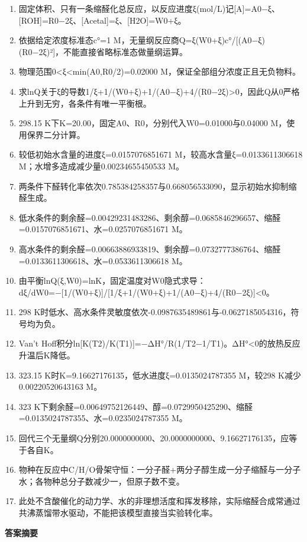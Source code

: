 \documentclass[UTF8,11pt,a4paper]{ctexart}
\begin{document}
\begin{enumerate}
\item 固定体积、只有一条缩醛化总反应，以反应进度ξ(mol/L)记[A]=A0−ξ、[ROH]=R0−2ξ、[Acetal]=ξ、[H2O]=W0+ξ。
\item 依据给定浓度标准态c°=1 M，无量纲反应商Q=ξ(W0+ξ)c°/[(A0−ξ)(R0−2ξ)²]，不能直接省略标准态做量纲运算。
\item 物理范围0<ξ<min(A0,R0/2)=0.02000 M，保证全部组分浓度正且无负物料。
\item 求lnQ关于ξ的导数1/ξ+1/(W0+ξ)+1/(A0−ξ)+4/(R0−2ξ)>0，因此Q从0严格上升到无穷，各条件有唯一平衡根。
\item 298.15 K下K=20.00，固定A0、R0，分别代入W0=0.01000与0.04000 M，使用保界二分计算。
\item 较低初始水含量的进度ξ=0.0157076851671 M，较高水含量ξ=0.0133611306618 M；水增多造成减少量0.00234655450533 M。
\item 两条件下醛转化率依次0.785384258357与0.668056533090，显示初始水抑制缩醛生成。
\item 低水条件的剩余醛=0.00429231483286、剩余醇=0.0685846296657、缩醛=0.0157076851671、水=0.0257076851671 M。
\item 高水条件的剩余醛=0.00663886933819、剩余醇=0.0732777386764、缩醛=0.0133611306618、水=0.0533611306618 M。
\item 由平衡lnQ(ξ,W0)=lnK，固定温度对W0隐式求导：dξ/dW0=−[1/(W0+ξ)]/[1/ξ+1/(W0+ξ)+1/(A0−ξ)+4/(R0−2ξ)]<0。
\item 298 K时低水、高水条件灵敏度依次-0.0987635489861与-0.0627185054316，符号均为负。
\item Van’t Hoff积分ln[K(T2)/K(T1)]=−ΔH°/R(1/T2−1/T1)。ΔH°<0的放热反应升温后K降低。
\item 323.15 K时K=9.16627176135，低水进度ξ=0.0135024787355 M，较298 K减少0.00220520643163 M。
\item 323 K下剩余醛=0.00649752126449、醇=0.0729950425290、缩醛=0.0135024787355、水=0.0235024787355 M。
\item 回代三个无量纲Q分别20.0000000000、20.0000000000、9.16627176135，应等于各自K。
\item 物种在反应中C/H/O骨架守恒：一分子醛+两分子醇生成一分子缩醛与一分子水；各物种总分子数减少一，但原子数不变。
\item 此处不含酸催化的动力学、水的非理想活度和挥发移除，实际缩醛合成常通过共沸蒸馏带水驱动，不能把该模型直接当实验转化率。
\end{enumerate}
\noindent\textbf{答案摘要}\par
\end{document}

